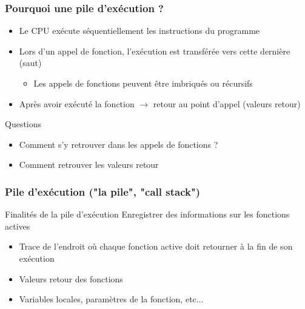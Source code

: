 \begin{frame}
\frametitle{Pourquoi une pile d'exécution ?}
\begin{itemize}
\item Le CPU exécute séquentiellement les instructions du programme
\item Lors d'un appel de fonction, l'exécution est transférée vers cette dernière (saut)
\begin{itemize}
\item Les appels de fonctions peuvent être imbriqués ou récursifs
\end{itemize}
\item Après avoir exécuté la fonction $\rightarrow$ retour au point d'appel (valeurs retour)
\end{itemize}
\begin{block}{Questions}
\begin{itemize}
\item Comment s'y retrouver dans les appels de fonctions ?
\item Comment retrouver les valeurs retour
\end{itemize}

\end{block}
\end{frame}

\begin{frame}
\frametitle{Pile d'exécution ("la pile", "call stack")}
\begin{block}{Finalités de la pile d'exécution}
Enregistrer des informations sur les fonctions actives
\begin{itemize}
\item Trace de l'endroit où chaque fonction active doit retourner à la fin de son exécution
\item Valeurs retour des fonctions
\item Variables locales, paramètres de la fonction, etc...
\end{itemize}
\end{block}
\end{frame}

